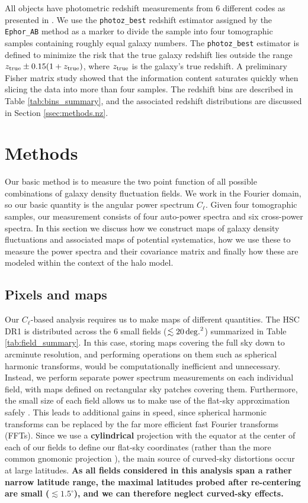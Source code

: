 \documentclass[a4paper,11pt]{article}
\newcommand{\rev}[1]{{\textbf{#1}}}
\begin{document}
  All objects have photometric redshift measurements from 6 different codes as presented in \cite{2018PASJ...70S...9T}. We use the {\tt photoz\_best} redshift estimator assigned by the {\tt Ephor\_AB} method as a marker to divide the sample into four tomographic samples containing roughly equal galaxy numbers. The {\tt photoz\_best} estimator is defined to minimize the risk that the true galaxy redshift lies outside the range $z_{\rm true}\pm 0.15(1+z_{\rm true})$, where $z_{\rm true}$ is the galaxy's true redshift. A preliminary Fisher matrix \cite{Fisher:1935} study showed that the information content saturates quickly when slicing the data into more than four samples. The redshift bins are described in Table \ref{tab:bins_summary}, and the associated redshift distributions are discussed in Section \ref{ssec:methods.nz}.

\section{Methods}\label{sec:methods}

Our basic method is to measure the two point function of all possible combinations of galaxy density fluctuation fields. We work in the Fourier domain, so our basic quantity is the angular power spectrum $C_\ell$. Given four tomographic samples, our measurement consists of four auto-power spectra and six cross-power spectra. In this section we discuss how we construct maps of galaxy density fluctuations and associated maps of potential systematics, how we use these to measure the power spectra and their covariance matrix and finally how these are modeled within the context of the halo model.


  \subsection{Pixels and maps}\label{ssec:methods.pix}
    Our $C_\ell$-based analysis requires us to make maps of different quantities. The HSC DR1 is distributed across the 6 small fields ($\lesssim20\,{\rm deg.}^2$) summarized in Table \ref{tab:field_summary}. In this case, storing maps covering the full sky down to arcminute resolution, and performing operations on them such as spherical harmonic transforms, would be computationally inefficient and unnecessary. Instead, we perform separate power spectrum measurements on each individual field, with maps defined on rectangular sky patches covering them. Furthermore, the small size of each field allows us to make use of the flat-sky approximation safely \citep{2014JCAP...10..007N}. This leads to additional gains in speed, since spherical harmonic transforms can be replaced by the far more efficient fast Fourier transforms (FFTs). Since we use a \rev{cylindrical} projection with the equator at the center of each of our fields to define our flat-sky coordinates (rather than the more common gnomonic projection \citep{2002A&A...395.1077C}), the main source of curved-sky distortions occur at large latitudes. \rev{As all fields considered in this analysis span a rather narrow latitude range, the maximal latitudes probed after re-centering are small ($\lesssim 1.5^\circ$), and we can therefore neglect curved-sky effects.}
    
\end{document}
